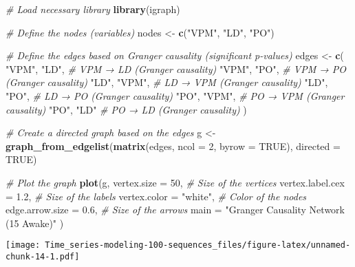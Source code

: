 \documentclass[
]{article}
\newenvironment{Shaded}{\begin{snugshade}}{\end{snugshade}}
\newcommand{\AttributeTok}[1]{\textcolor[rgb]{0.13,0.29,0.53}{#1}}
\newcommand{\CommentTok}[1]{\textcolor[rgb]{0.56,0.35,0.01}{\textit{#1}}}
\newcommand{\ConstantTok}[1]{\textcolor[rgb]{0.56,0.35,0.01}{#1}}
\newcommand{\DecValTok}[1]{\textcolor[rgb]{0.00,0.00,0.81}{#1}}
\newcommand{\FloatTok}[1]{\textcolor[rgb]{0.00,0.00,0.81}{#1}}
\newcommand{\FunctionTok}[1]{\textcolor[rgb]{0.13,0.29,0.53}{\textbf{#1}}}
\newcommand{\NormalTok}[1]{#1}
\newcommand{\OtherTok}[1]{\textcolor[rgb]{0.56,0.35,0.01}{#1}}
\newcommand{\StringTok}[1]{\textcolor[rgb]{0.31,0.60,0.02}{#1}}
\begin{document}
\begin{Shaded}
\begin{Highlighting}[]
\CommentTok{\# Load necessary library}
\FunctionTok{library}\NormalTok{(igraph)}

\CommentTok{\# Define the nodes (variables)}
\NormalTok{nodes }\OtherTok{\textless{}{-}} \FunctionTok{c}\NormalTok{(}\StringTok{"VPM"}\NormalTok{, }\StringTok{"LD"}\NormalTok{, }\StringTok{"PO"}\NormalTok{)}

\CommentTok{\# Define the edges based on Granger causality (significant p{-}values)}
\NormalTok{edges }\OtherTok{\textless{}{-}} \FunctionTok{c}\NormalTok{(}
  \StringTok{"VPM"}\NormalTok{, }\StringTok{"LD"}\NormalTok{,  }\CommentTok{\# VPM → LD (Granger causality)}
  \StringTok{"VPM"}\NormalTok{, }\StringTok{"PO"}\NormalTok{,  }\CommentTok{\# VPM → PO (Granger causality)}
  \StringTok{"LD"}\NormalTok{, }\StringTok{"VPM"}\NormalTok{,  }\CommentTok{\# LD → VPM (Granger causality)}
  \StringTok{"LD"}\NormalTok{, }\StringTok{"PO"}\NormalTok{,  }\CommentTok{\# LD → PO (Granger causality)}
  \StringTok{"PO"}\NormalTok{, }\StringTok{"VPM"}\NormalTok{,  }\CommentTok{\# PO → VPM (Granger causality)}
  \StringTok{"PO"}\NormalTok{, }\StringTok{"LD"}   \CommentTok{\# PO → LD (Granger causality)}
\NormalTok{)}

\CommentTok{\# Create a directed graph based on the edges}
\NormalTok{g }\OtherTok{\textless{}{-}} \FunctionTok{graph\_from\_edgelist}\NormalTok{(}\FunctionTok{matrix}\NormalTok{(edges, }\AttributeTok{ncol =} \DecValTok{2}\NormalTok{, }\AttributeTok{byrow =} \ConstantTok{TRUE}\NormalTok{), }\AttributeTok{directed =} \ConstantTok{TRUE}\NormalTok{)}

\CommentTok{\# Plot the graph}
\FunctionTok{plot}\NormalTok{(g,}
     \AttributeTok{vertex.size =} \DecValTok{50}\NormalTok{,                  }\CommentTok{\# Size of the vertices}
     \AttributeTok{vertex.label.cex =} \FloatTok{1.2}\NormalTok{,            }\CommentTok{\# Size of the labels}
     \AttributeTok{vertex.color =} \StringTok{"white"}\NormalTok{,        }\CommentTok{\# Color of the nodes}
     \AttributeTok{edge.arrow.size =} \FloatTok{0.6}\NormalTok{,             }\CommentTok{\# Size of the arrows}
     \AttributeTok{main =} \StringTok{"Granger Causality Network (15 Awake)"}
\NormalTok{)}
\end{Highlighting}
\end{Shaded}

\texttt{[image: Time\_series-modeling-100-sequences\_files/figure-latex/unnamed-chunk-14-1.pdf]}
\end{document}

